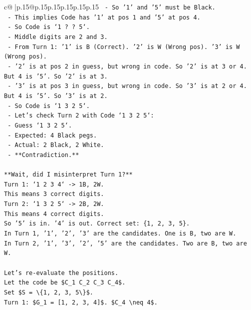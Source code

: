 \documentclass{article}
\begin{document}
{\begin{supertabular}{c@{$\;$}|p{.15\linewidth}@{}p{.15\linewidth}p{.15\linewidth}p{.15\linewidth}p{.15\linewidth}p{.15\linewidth}}
{{{\texttt{          {-} So '1' and '5' must be Black.} \\
\texttt{          {-} This implies Code has '1' at pos 1 and '5' at pos 4.} \\
\texttt{          {-} So Code is `1 ? ? 5`.} \\
\texttt{          {-} Middle digits are 2 and 3.} \\
\texttt{          {-} From Turn 1: '1' is B (Correct). '2' is W (Wrong pos). '3' is W (Wrong pos).} \\
\texttt{            {-} '2' is at pos 2 in guess, but wrong in code. So '2' is at 3 or 4. But 4 is '5'. So '2' is at 3.} \\
\texttt{            {-} '3' is at pos 3 in guess, but wrong in code. So '3' is at 2 or 4. But 4 is '5'. So '3' is at 2.} \\
\texttt{          {-} So Code is `1 3 2 5`.} \\
\texttt{          {-} Let's check Turn 2 with Code `1 3 2 5`:} \\
\texttt{            {-} Guess `1 3 2 5`.} \\
\texttt{            {-} Expected: 4 Black pegs.} \\
\texttt{            {-} Actual: 2 Black, 2 White.} \\
\texttt{            {-} **Contradiction.**} \\
\\ 
\texttt{**Wait, did I misinterpret Turn 1?**} \\
\texttt{Turn 1: `1 2 3 4` {-}> 1B, 2W.} \\
\texttt{This means 3 correct digits.} \\
\texttt{Turn 2: `1 3 2 5` {-}> 2B, 2W.} \\
\texttt{This means 4 correct digits.} \\
\texttt{So '5' is in. '4' is out. Correct set: \{1, 2, 3, 5\}.} \\
\texttt{In Turn 1, '1', '2', '3' are the candidates. One is B, two are W.} \\
\texttt{In Turn 2, '1', '3', '2', '5' are the candidates. Two are B, two are W.} \\
\\ 
\texttt{Let's re{-}evaluate the positions.} \\
\texttt{Let the code be \$C\_1 C\_2 C\_3 C\_4\$.} \\
\texttt{Set \$S = \textbackslash{}\{1, 2, 3, 5\textbackslash{}\}\$.} \\
\texttt{Turn 1: \$G\_1 = {[}1, 2, 3, 4{]}\$. \$C\_4 \textbackslash{}neq 4\$.} \\
}}}
\end{supertabular}}
\end{document}
